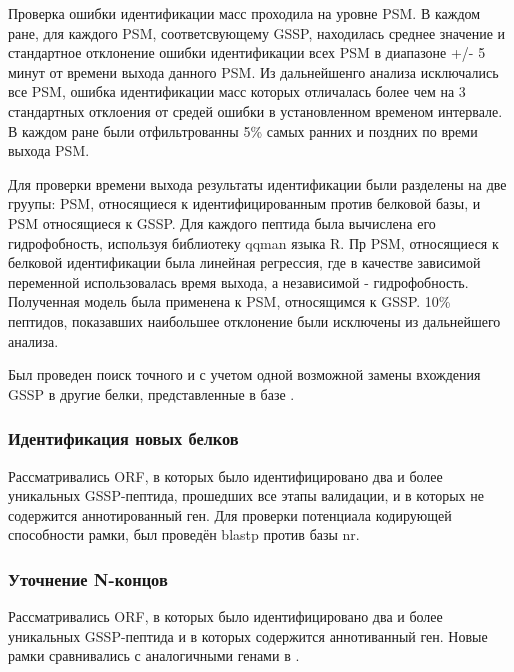 Проверка ошибки идентификации масс проходила на уровне PSM. В каждом ране, для каждого PSM, соответсвующему GSSP, находилась среднее значение и стандартное отклонение ошибки идентификации всех PSM в диапазоне +/- 5 минут от времени выхода данного PSM. Из дальнейшенго анализа исключались все PSM, ошибка идентификации масс которых отличалась более чем на 3 стандартных отклоения от средей ошибки в установленном временом интервале. В каждом ране были отфильтрованны 5\% самых ранних и поздних по времи выхода PSM.

Для проверки времени выхода результаты идентификации были разделены на две груупы: PSM, относящиеся к идентифицированным против белковой базы, и PSM относящиеся к GSSP. Для каждого пептида была вычислена его гидрофобность, используя библиотеку qqman языка R. Пр PSM, относящиеся к белковой идентификации была линейная регрессия, где в качестве зависимой переменной использовалась время выхода, а независимой - гидрофобность. Полученная модель была применена к PSM, относящимся к GSSP. 10\% пептидов, показавших наибольшее отклонение были исключены из дальнейшего анализа.

Был проведен поиск точного и с учетом одной возможной замены вхождения GSSP в другие белки, представленные в базе .  


\subsubsection{Идентификация новых белков}
Рассматривались ORF, в которых было идентифицировано два и более уникальных GSSP-пептида, прошедших все этапы валидации, и в которых не содержится аннотированный ген. Для проверки потенциала кодирующей способности рамки, был проведён blastp против базы nr. 

\subsubsection{Уточнение N-концов}
Рассматривались ORF, в которых было идентифицировано два и более уникальных GSSP-пептида и в которых содержится аннотиванный ген. Новые рамки сравнивались с аналогичными генами в .



